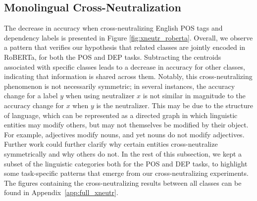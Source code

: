 \documentclass[11pt,a4paper]{article}
\begin{document}
\subsection{Monolingual Cross-Neutralization}
\label{sec:evaluation-monolingual}
The decrease in accuracy when cross-neutralizing English POS tags and dependency labels is presented in Figure \ref{fig:xneutr_roberta}. Overall, we observe a pattern that verifies our hypothesis that related classes are jointly encoded in RoBERTa, for both the POS and DEP tasks. Subtracting the centroids associated with specific classes leads to a decrease in accuracy for other classes, indicating that information is shared across them. Notably, this cross-neutralizing phenomenon is not necessarily symmetric; in several instances, the accuracy change for a label $y$ when using neutralizer $x$ is not similar in magnitude to the accuracy change for $x$ when $y$ is the neutralizer. This may be due to the structure of language, which can be represented as a directed graph in which linguistic entities may modify others, but may not themselves be modified by their object. For example, adjectives modify nouns, and yet nouns do not modify adjectives. Further work could further clarify why certain entities cross-neutralize symmetrically and why others do not. In the rest of this subsection, we kept a subset of the linguistic categories both for the POS and DEP tasks, to highlight some task-specific patterns that emerge from our cross-neutralizing experiments. The figures containing the cross-neutralizing results between all classes can be found in Appendix~\ref{app:full_xneutr}.
\end{document}
